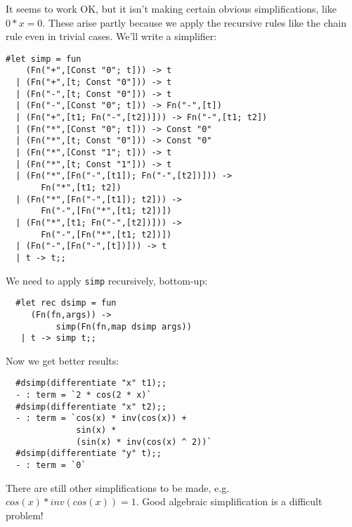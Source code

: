 \begin{slide*}


It seems to work OK, but it isn't making certain obvious simplifications,
like {\red $0 * x = 0$}. These arise partly because we apply the recursive
rules like the chain rule even in trivial cases. We'll write a simplifier:

\begin{black}\begin{footnotesize}\begin{verbatim}
#let simp = fun
    (Fn("+",[Const "0"; t])) -> t
  | (Fn("+",[t; Const "0"])) -> t
  | (Fn("-",[t; Const "0"])) -> t
  | (Fn("-",[Const "0"; t])) -> Fn("-",[t])
  | (Fn("+",[t1; Fn("-",[t2])])) -> Fn("-",[t1; t2])
  | (Fn("*",[Const "0"; t])) -> Const "0"
  | (Fn("*",[t; Const "0"])) -> Const "0"
  | (Fn("*",[Const "1"; t])) -> t
  | (Fn("*",[t; Const "1"])) -> t
  | (Fn("*",[Fn("-",[t1]); Fn("-",[t2])])) ->
       Fn("*",[t1; t2])
  | (Fn("*",[Fn("-",[t1]); t2])) ->
       Fn("-",[Fn("*",[t1; t2])])
  | (Fn("*",[t1; Fn("-",[t2])])) ->
       Fn("-",[Fn("*",[t1; t2])])
  | (Fn("-",[Fn("-",[t])])) -> t
  | t -> t;;
\end{verbatim}\end{footnotesize}\end{black}

\end{slide*}




\begin{slide*}


We need to apply {\black \tt simp} recursively, bottom-up:

\begin{black}\begin{verbatim}
  #let rec dsimp = fun
     (Fn(fn,args)) ->
          simp(Fn(fn,map dsimp args))
   | t -> simp t;;
\end{verbatim}\end{black}

Now we get better results:

\begin{black}\begin{verbatim}
  #dsimp(differentiate "x" t1);;
  - : term = `2 * cos(2 * x)`
  #dsimp(differentiate "x" t2);;
  - : term = `cos(x) * inv(cos(x)) +
              sin(x) *
              (sin(x) * inv(cos(x) ^ 2))`
  #dsimp(differentiate "y" t);;
  - : term = `0`
\end{verbatim}\end{black}

There are still other simplifications to be made, e.g. {\red $cos(x) *
inv(cos(x)) = 1$}. Good algebraic simplification is a difficult problem!

\end{slide*}






